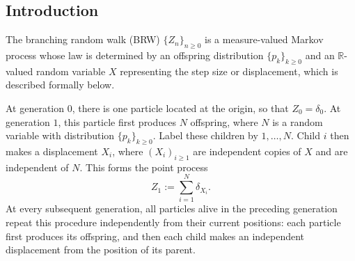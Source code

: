 \documentclass[a4paper, 11pt]{article}
\newcommand{\1}{\mathbf 1}
\theoremstyle{plain}
\begin{document}
\subsection{Introduction}
The branching random walk (BRW) \(\{Z_n\}_{n\geq0}\) is a
measure-valued Markov process whose law is determined by an offspring
distribution \(\{p_k\}_{k\geq0}\) and an \(\mathbb{R}\)-valued random variable
\(X\) representing the step size or displacement, which is described formally below.
\par
At generation \(0\), there is one particle located at the origin, so that
\(Z_0=\delta_0\). At generation \(1\), this particle first produces \(N\)
offspring, where $N$ is a random variable with distribution \(\{p_k\}_{k\geq0}\).
Label these children by \(1,\ldots,N\). Child \(i\) then makes a
displacement \(X_i\), where \((X_i)_{i\geq1}\) are independent copies of
\(X\) and are independent of \(N\). This forms the point process
\[
  Z_1:=\sum_{i=1}^{N}\delta_{X_i}.
\]
At every subsequent generation, all particles alive in the preceding
generation repeat this procedure independently from their current positions:
each particle first produces its offspring, and then each child makes an
independent displacement from the position of its parent.
\end{document}

